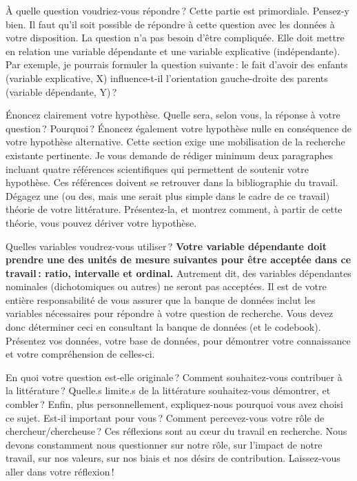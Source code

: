 \documentclass[11pt]{article}
\newcommand{\partie}[2]{\par\vspace{7pt}\Needspace{4\baselineskip}{\titre\large\color{rouge}#1}\hspace{0.6em}{\titre\large #2}\par\vspace{1pt}}
\begin{document}
\partie{1}{Une question de recherche précise}
À quelle question voudriez-vous répondre ? Cette partie est primordiale. Pensez-y bien. Il faut qu'il soit possible de répondre à cette question avec les données à votre disposition. La question n'a pas besoin d'être compliquée. Elle doit mettre en relation une variable dépendante et une variable explicative (indépendante). Par exemple, je pourrais formuler la question suivante : le fait d'avoir des enfants (variable explicative, X) influence-t-il l'orientation gauche-droite des parents (variable dépendante, Y) ?

\partie{2}{Une hypothèse bien formulée, dérivée de la littérature}
Énoncez clairement votre hypothèse. Quelle sera, selon vous, la réponse à votre question ? Pourquoi ? Énoncez également votre hypothèse nulle en conséquence de votre hypothèse alternative. Cette section exige une mobilisation de la recherche existante pertinente. Je vous demande de rédiger minimum deux paragraphes incluant quatre références scientifiques qui permettent de soutenir votre hypothèse. Ces références doivent se retrouver dans la bibliographie du travail. Dégagez une (ou des, mais une serait plus simple dans le cadre de ce travail) théorie de votre littérature. Présentez-la, et montrez comment, à partir de cette théorie, vous pouvez dériver votre hypothèse.

\partie{3}{Une présentation des données}
Quelles variables voudrez-vous utiliser ? \textbf{Votre variable dépendante doit prendre une des unités de mesure suivantes pour être acceptée dans ce travail : ratio, intervalle et ordinal.} Autrement dit, des variables dépendantes nominales (dichotomiques ou autres) ne seront pas acceptées. Il est de votre entière responsabilité de vous assurer que la banque de données inclut les variables nécessaires pour répondre à votre question de recherche. Vous devez donc déterminer ceci en consultant la banque de données (et le codebook). Présentez vos données, votre base de données, pour démontrer votre connaissance et votre compréhension de celles-ci.

\partie{4}{Pertinence, contribution et justification personnelle}
En quoi votre question est-elle originale ? Comment souhaitez-vous contribuer à la littérature ? Quelle.s limite.s de la littérature souhaitez-vous démontrer, et combler ? Enfin, plus personnellement, expliquez-nous pourquoi vous avez choisi ce sujet. Est-il important pour vous ? Comment percevez-vous votre rôle de chercheur/chercheuse ? Ces réflexions sont au cœur du travail en recherche. Nous devons constamment nous questionner sur notre rôle, sur l'impact de notre travail, sur nos valeurs, sur nos biais et nos désirs de contribution. Laissez-vous aller dans votre réflexion !
\end{document}
